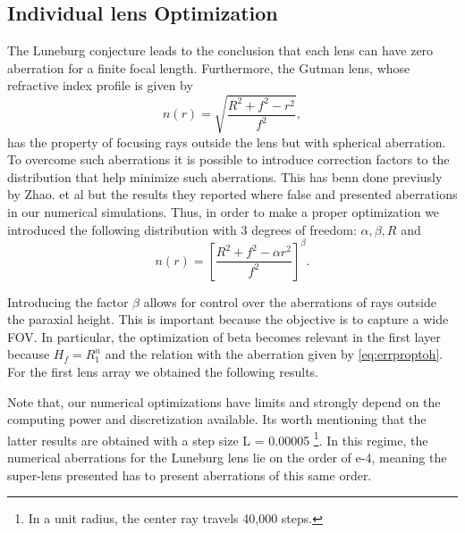 \subsection{Individual lens Optimization}
The Luneburg conjecture leads to the conclusion that each lens can have zero aberration for a finite focal length. Furthermore, the Gutman lens, whose refractive index profile is given by
\begin{equation}
    n(r) = \sqrt{\frac{R^2+f^2-r^2}{f^2}},
\end{equation}
has the property of focusing rays outside the lens but with spherical aberration. To overcome such aberrations it is possible to introduce correction factors to the distribution that help minimize such aberrations. This has benn done previusly by Zhao. et al \cite{zhao} but the results they reported where false and presented aberrations in our numerical simulations. Thus, in order to make a proper optimization we introduced the following distribution with 3 degrees of freedom: $\alpha,\beta,R$ and
\begin{equation}
    n(r) = [\frac{R^2+f^2-\alpha r^2}{f^2}]^\beta.
\end{equation}

Introducing the factor $\beta$ allows for control over the aberrations of rays outside the paraxial height. This is important because the objective is to capture a wide FOV. In particular, the optimization of beta becomes relevant in the first layer because $H_f=R_1^n$ and the relation with the aberration given by \ref{eq:errproptoh}. For the first lens array we obtained the following results. 
\begin{center}
    \begin{table}[H]
    \end{table}
\end{center}


Note that, our numerical optimizations have limits and strongly depend on the computing power and discretization available. Its worth mentioning that the latter results are obtained with a step size L = 0.00005 \footnote{In a unit radius, the center ray travels 40,000 steps. }. In this regime, the numerical aberrations for the Luneburg lens lie on the order of e-4, meaning the super-lens presented has to present aberrations of this same order.\\

